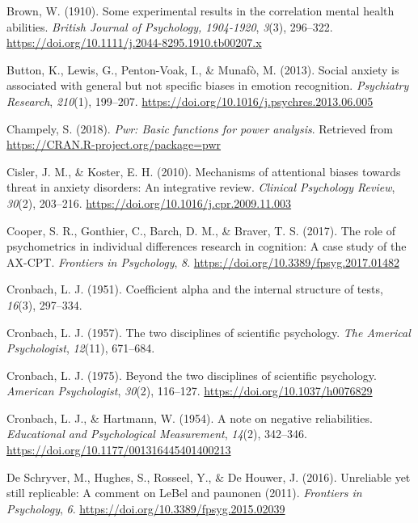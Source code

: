 \documentclass[english,,man,floatsintext]{apa6}
\begin{document}
\leavevmode\hypertarget{ref-brown_experimental_1910}{}%
Brown, W. (1910). Some experimental results in the correlation mental health abilities. \emph{British Journal of Psychology, 1904-1920}, \emph{3}(3), 296--322. \url{https://doi.org/10.1111/j.2044-8295.1910.tb00207.x}

\leavevmode\hypertarget{ref-button_social_2013}{}%
Button, K., Lewis, G., Penton-Voak, I., \& Munafò, M. (2013). Social anxiety is associated with general but not specific biases in emotion recognition. \emph{Psychiatry Research}, \emph{210}(1), 199--207. \url{https://doi.org/10.1016/j.psychres.2013.06.005}

\leavevmode\hypertarget{ref-R-pwr}{}%
Champely, S. (2018). \emph{Pwr: Basic functions for power analysis}. Retrieved from \url{https://CRAN.R-project.org/package=pwr}

\leavevmode\hypertarget{ref-cisler_mechanisms_2010}{}%
Cisler, J. M., \& Koster, E. H. (2010). Mechanisms of attentional biases towards threat in anxiety disorders: An integrative review. \emph{Clinical Psychology Review}, \emph{30}(2), 203--216. \url{https://doi.org/10.1016/j.cpr.2009.11.003}

\leavevmode\hypertarget{ref-cooper_role_2017}{}%
Cooper, S. R., Gonthier, C., Barch, D. M., \& Braver, T. S. (2017). The role of psychometrics in individual differences research in cognition: A case study of the AX-CPT. \emph{Frontiers in Psychology}, \emph{8}. \url{https://doi.org/10.3389/fpsyg.2017.01482}

\leavevmode\hypertarget{ref-cronbach_l._j._coefficient_1951}{}%
Cronbach, L. J. (1951). Coefficient alpha and the internal structure of tests, \emph{16}(3), 297--334.

\leavevmode\hypertarget{ref-cronbach_two_1957}{}%
Cronbach, L. J. (1957). The two disciplines of scientific psychology. \emph{The Americal Psychologist}, \emph{12}(11), 671--684.

\leavevmode\hypertarget{ref-cronbach_beyond_1975}{}%
Cronbach, L. J. (1975). Beyond the two disciplines of scientific psychology. \emph{American Psychologist}, \emph{30}(2), 116--127. \url{https://doi.org/10.1037/h0076829}

\leavevmode\hypertarget{ref-cronbach_note_1954}{}%
Cronbach, L. J., \& Hartmann, W. (1954). A note on negative reliabilities. \emph{Educational and Psychological Measurement}, \emph{14}(2), 342--346. \url{https://doi.org/10.1177/001316445401400213}

\leavevmode\hypertarget{ref-de_schryver_unreliable_2016}{}%
De Schryver, M., Hughes, S., Rosseel, Y., \& De Houwer, J. (2016). Unreliable yet still replicable: A comment on LeBel and paunonen (2011). \emph{Frontiers in Psychology}, \emph{6}. \url{https://doi.org/10.3389/fpsyg.2015.02039}
\end{document}
